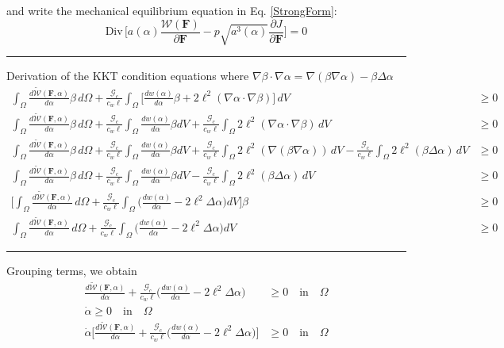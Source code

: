 \documentclass[12pt,3p]{article}
\numberwithin{equation}{section}
\begin{document}
and write the mechanical equilibrium equation in Eq. \ref{StrongForm}:
\begin{equation}\label{Eqm}
\text{Div} \, \bigg[ a(\alpha) \frac{\mathcal{W}(\mathbf{F})}{\partial \mathbf{F}} - p \sqrt{a^3(\alpha)} \frac{\partial J}{\partial \mathbf{F}} \bigg] = 0 
\end{equation}
\noindent\rule{\linewidth}{0.5pt} %
Derivation of the KKT condition equations where $\nabla \beta \cdot \nabla \alpha = \nabla (\beta \nabla \alpha) - \beta \Delta \alpha$
\begin{align*}
\int_\Omega \frac{d \widetilde{\mathcal{W}}(\mathbf{F}, \alpha)}{d \alpha} \beta \, d\Omega + \frac{\mathcal{G}_c}{c_w \ell} \int_\Omega \bigg[ \frac{d w(\alpha)}{d \alpha} \beta + 2 \ell^2 (\nabla \alpha \cdot \nabla \beta) \bigg] \, dV &\geq 0 \\
\int_\Omega \frac{d \widetilde{\mathcal{W}}(\mathbf{F}, \alpha)}{d \alpha} \beta \, d\Omega + \frac{\mathcal{G}_c}{c_w \ell} \int_\Omega \frac{d w(\alpha)}{d \alpha} \beta dV + \frac{\mathcal{G}_c}{c_w \ell} \int_{\Omega} 2 \ell^2 (\nabla \alpha \cdot \nabla \beta)  \, dV &\geq 0 \\
\int_\Omega \frac{d \widetilde{\mathcal{W}}(\mathbf{F}, \alpha)}{d \alpha} \beta \, d\Omega +  \frac{\mathcal{G}_c}{c_w \ell} \int_\Omega \frac{d w(\alpha)}{d \alpha} \beta dV + \frac{\mathcal{G}_c}{c_w \ell} \int_{\Omega} 2 \ell^2 ( \nabla (\beta \nabla \alpha))  \, dV - \frac{\mathcal{G}_c}{c_w \ell} \int_{\Omega} 2 \ell^2 (\beta \Delta \alpha)  \, dV &\geq 0 \\
\int_\Omega \frac{d \widetilde{\mathcal{W}}(\mathbf{F}, \alpha)}{d \alpha} \beta \, d\Omega +  \frac{\mathcal{G}_c}{c_w \ell} \int_\Omega \frac{d w(\alpha)}{d \alpha} \beta dV  - \frac{\mathcal{G}_c}{c_w \ell} \int_{\Omega} 2 \ell^2 (\beta \Delta \alpha)  \, dV &\geq 0 \\
\bigg[ \int_\Omega \frac{d \widetilde{\mathcal{W}}(\mathbf{F}, \alpha)}{d \alpha} \, d\Omega +  \frac{\mathcal{G}_c}{c_w \ell} \int_\Omega \bigg( \frac{d w(\alpha)}{d \alpha}  - 2 \ell^2 \Delta \alpha\bigg) dV \bigg] \beta &\geq 0 \\
\int_\Omega \frac{d \widetilde{\mathcal{W}}(\mathbf{F}, \alpha)}{d \alpha} \, d\Omega +  \frac{\mathcal{G}_c}{c_w \ell} \int_\Omega \bigg( \frac{d w(\alpha)}{d \alpha}  - 2 \ell^2 \Delta \alpha\bigg) dV &\geq 0 
\end{align*}
\noindent\rule{\linewidth}{0.5pt} %
Grouping terms, we obtain
\begin{subequations}
\begin{align}
\frac{d \widetilde{\mathcal{W}}(\mathbf{F}, \alpha)}{d \alpha} + \frac{\mathcal{G}_c}{c_w \ell}  \bigg( \frac{d w(\alpha)}{d \alpha}  - 2 \ell^2 \Delta \alpha\bigg) &\geq 0 \quad \text{in} \quad \Omega \\
\dot{\alpha} \geq 0 \quad \text{in} \quad \Omega \\
\dot{\alpha} \bigg[ \frac{d \widetilde{\mathcal{W}}(\mathbf{F}, \alpha)}{d \alpha} + \frac{\mathcal{G}_c}{c_w \ell}  \bigg( \frac{d w(\alpha)}{d \alpha}  - 2 \ell^2 \Delta \alpha\bigg) \bigg] &\geq 0 \quad \text{in} \quad \Omega \\
\end{align}
\end{subequations}
\end{document}
